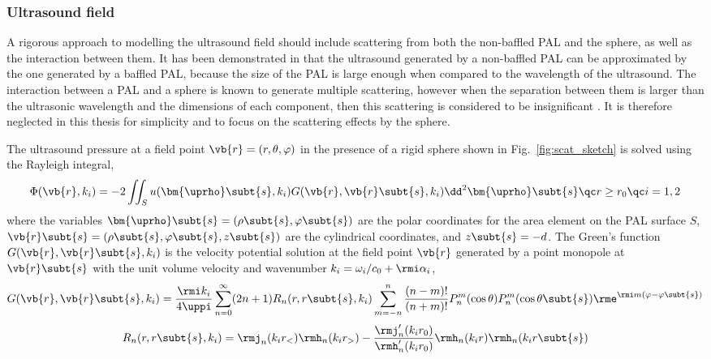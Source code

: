 \subsubsection{Ultrasound field}
A rigorous approach to modelling the ultrasound field should include scattering from both the non-baffled PAL and the sphere, as well as the interaction between them. 
It has been demonstrated in \cite{Zhong2020NonparaxialModelAudio} that the ultrasound generated by a non-baffled PAL can be approximated by the one generated by a baffled PAL, because the size of the PAL is large enough when compared to the wavelength of the ultrasound. 
The interaction between a PAL and a sphere is known to generate multiple scattering, however when the separation between them is larger than the ultrasonic wavelength and the dimensions of each component, then this scattering is considered to be insignificant \cite{Gaunaurd1995AcousticScatteringPair}.
It is therefore neglected in this thesis for simplicity and to focus on the scattering effects by the sphere.

The ultrasound pressure at a field point $\vb{r} = (r, \theta, \varphi)$ in the presence of a rigid sphere shown in Fig.~\ref{fig:scat_sketch} is solved using the Rayleigh integral,
\begin{equation}
    \Phi(\vb{r}, k_i) = -2\iint_S u(\bm{\uprho}\subt{s},k_i) G(\vb{r},\vb{r}\subt{s},k_i)\dd^2 \bm{\uprho}\subt{s}\qc
    r\geq r_0\qc i = 1,2
    \label{eq:sphere:w89fsjdp}
\end{equation}
where the variables $\bm{\uprho}\subt{s}  = (\rho\subt{s}, \varphi\subt{s})$ are the polar coordinates for the area element on the PAL surface $S$, 
$ \vb{r}\subt{s} = (\rho\subt{s},\varphi\subt{s},z\subt{s})$ are the cylindrical coordinates, and  $z\subt{s}=-d$.
The Green's function $G(\vb{r},\vb{r}\subt{s},k_i)$ is the velocity potential solution at the field point $\vb{r}$ generated by a point monopole at $\vb{r}\subt{s}$ with the unit volume velocity and wavenumber 
$k_i = \omega_i/c_0+\rmi \alpha_i$, \cite{Lin2004ActiveControlRadiation, Zou2007PreliminaryExperimentalStudy}
\begin{equation}
    G(\vb{r},\vb{r}\subt{s}, k_i)
    = 
    \frac{\rmi k_i}{4\uppi}
    \sum_{n=0}^\infty
    (2n+1)R_n(r,r\subt{s},k_i)
    \sum_{m=-n}^n \frac{(n-m)!}{(n+m)!} P_n^m(\cos\theta)P_n^m(\cos\theta\subt{s})
    \rme^{\rmi m (\varphi-\varphi\subt{s})}
    \label{eq:sphere:398fsjpd}
\end{equation}
\begin{equation}
    R_n(r,r\subt{s},k_i) = 
    \rmj_n(k_i r_<)\rmh_n(k_ir_>) - 
    \frac{\rmj_n'(k_ir_0)}{\rmh_n'(k_ir_0)}
    \rmh_n(k_ir)\rmh_n(k_ir\subt{s})
    \label{eq:fskldjfie}
\end{equation}

